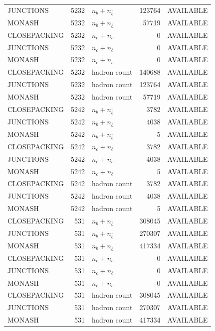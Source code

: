 \begin{landscape}
\begin{longtable}{@{}lrlrl@{}}
JUNCTIONS & 5232 & $n_b+n_{\bar b}$ & \num{123764} & AVAILABLE \\
MONASH & 5232 & $n_b+n_{\bar b}$ & \num{57719} & AVAILABLE \\
CLOSEPACKING & 5232 & $n_c+n_{\bar c}$ & \num{0} & AVAILABLE \\
JUNCTIONS & 5232 & $n_c+n_{\bar c}$ & \num{0} & AVAILABLE \\
MONASH & 5232 & $n_c+n_{\bar c}$ & \num{0} & AVAILABLE \\
CLOSEPACKING & 5232 & hadron count & \num{140688} & AVAILABLE \\
JUNCTIONS & 5232 & hadron count & \num{123764} & AVAILABLE \\
MONASH & 5232 & hadron count & \num{57719} & AVAILABLE \\
CLOSEPACKING & 5242 & $n_b+n_{\bar b}$ & \num{3782} & AVAILABLE \\
JUNCTIONS & 5242 & $n_b+n_{\bar b}$ & \num{4038} & AVAILABLE \\
MONASH & 5242 & $n_b+n_{\bar b}$ & \num{5} & AVAILABLE \\
CLOSEPACKING & 5242 & $n_c+n_{\bar c}$ & \num{3782} & AVAILABLE \\
JUNCTIONS & 5242 & $n_c+n_{\bar c}$ & \num{4038} & AVAILABLE \\
MONASH & 5242 & $n_c+n_{\bar c}$ & \num{5} & AVAILABLE \\
CLOSEPACKING & 5242 & hadron count & \num{3782} & AVAILABLE \\
JUNCTIONS & 5242 & hadron count & \num{4038} & AVAILABLE \\
MONASH & 5242 & hadron count & \num{5} & AVAILABLE \\
CLOSEPACKING & 531 & $n_b+n_{\bar b}$ & \num{308045} & AVAILABLE \\
JUNCTIONS & 531 & $n_b+n_{\bar b}$ & \num{270307} & AVAILABLE \\
MONASH & 531 & $n_b+n_{\bar b}$ & \num{417334} & AVAILABLE \\
CLOSEPACKING & 531 & $n_c+n_{\bar c}$ & \num{0} & AVAILABLE \\
JUNCTIONS & 531 & $n_c+n_{\bar c}$ & \num{0} & AVAILABLE \\
MONASH & 531 & $n_c+n_{\bar c}$ & \num{0} & AVAILABLE \\
CLOSEPACKING & 531 & hadron count & \num{308045} & AVAILABLE \\
JUNCTIONS & 531 & hadron count & \num{270307} & AVAILABLE \\
MONASH & 531 & hadron count & \num{417334} & AVAILABLE \\

\end{longtable}
\end{landscape}
